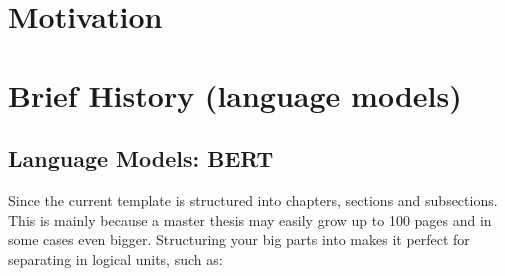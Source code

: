 \section{Motivation}






\section{Brief History (language models)}

\subsection{Language Models: BERT}
Since the current template is structured into chapters, sections and subsections. This is mainly because a master thesis may easily grow up to 100 pages and in some cases even bigger. Structuring your big parts into  makes it perfect for separating in logical units, such as:

